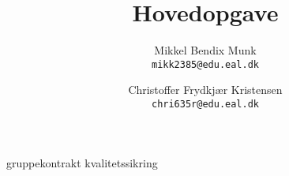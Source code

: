 \documentclass[a4paper, 11pt, danish]{report}
\title{Hovedopgave}
\author{
    Mikkel Bendix Munk\\
    \texttt{mikk2385@edu.eal.dk}
    \and
    Christoffer Frydkjær Kristensen\\
    \texttt{chri635r@edu.eal.dk}
}
\begin{document}
\maketitle
\tableofcontents{}
\newpage
%
%
%
{gruppekontrakt}
{kvalitetssikring}
%
%
\end{document}
